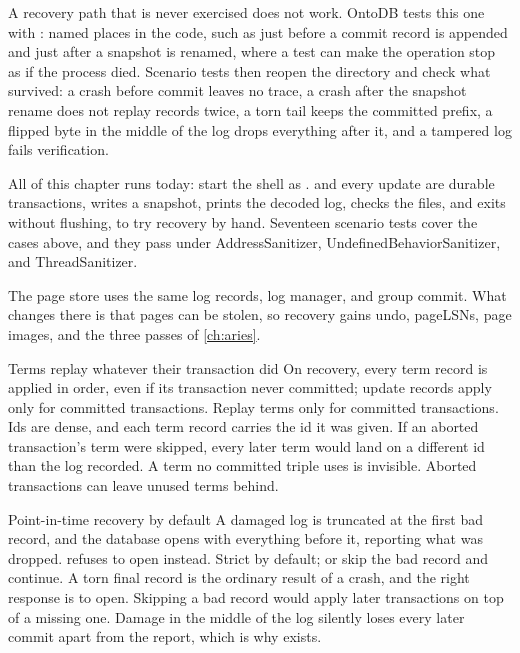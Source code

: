 A recovery path that is never exercised does not work. OntoDB tests this one with
: named places in the code, such as just before a commit
record is appended and just after a snapshot is renamed, where a test can make
the operation stop as if the process died. Scenario tests then reopen the
directory and check what survived: a crash before commit leaves no trace, a crash
after the snapshot rename does not replay records twice, a torn tail keeps the
committed prefix, a flipped byte in the middle of the log drops everything after
it, and a tampered log fails verification.

\begin{ontodb}
All of this chapter runs today: start the shell as .
 and every update are durable transactions,
 writes a snapshot, 
prints the decoded log,  checks the files, and
 exits without flushing, to try recovery by hand.
Seventeen scenario tests cover the cases above, and they pass under
AddressSanitizer, UndefinedBehaviorSanitizer, and ThreadSanitizer.

The page store uses the same log records, log manager, and group commit. What
changes there is that pages can be stolen, so recovery gains undo, pageLSNs,
page images, and the three passes of \cref{ch:aries}.
\end{ontodb}

\begin{decision}{Terms replay whatever their transaction did}
 On recovery, every term record is applied in order, even if its
transaction never committed; update records apply only for committed
transactions.
 Replay terms only for committed transactions.
 Ids are dense, and each term record carries the id it was given.
If an aborted transaction's term were skipped, every later term would land on a
different id than the log recorded. A term no committed triple uses is
invisible.
 Aborted transactions can leave unused terms behind.
\end{decision}

\begin{decision}{Point-in-time recovery by default}
 A damaged log is truncated at the first bad record, and the
database opens with everything before it, reporting what was dropped.
 refuses to open instead.
 Strict by default; or skip the bad record and continue.
 A torn final record is the ordinary result of a crash, and the
right response is to open. Skipping a bad record would apply later
transactions on top of a missing one.
 Damage in the middle of the log silently loses every later commit
apart from the report, which is why  exists.
\end{decision}


